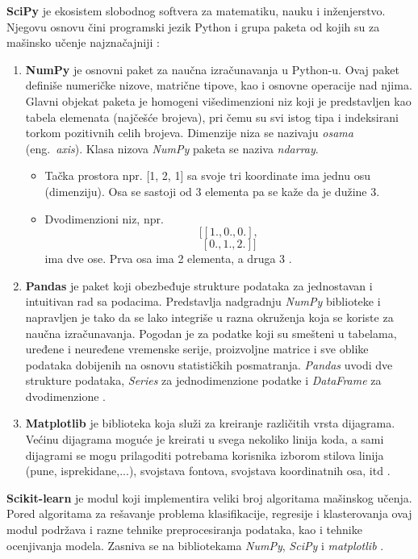 \documentclass[12pt,oneside]{memoir}
\begin{document}
\textbf{SciPy} je ekosistem slobodnog softvera za matematiku, nauku i inženjerstvo. Njegovu osnovu čini programski jezik Python i grupa paketa od kojih su za mašinsko učenje najznačajniji \cite{scipy}:
\begin{enumerate}[1)]
\item \textbf{NumPy} je osnovni paket za naučna izračunavanja u Python-u. Ovaj paket definiše numeričke nizove, matrične tipove, kao i osnovne operacije nad njima.  %
Glavni objekat paketa je homogeni višedimenzioni niz koji je predstavljen kao tabela elemenata (najčešće brojeva), pri čemu su svi istog tipa i indeksirani torkom pozitivnih celih brojeva. Dimenzije niza se nazivaju \textit{osama} (eng.~\textit{axis}). Klasa nizova \textit{NumPy} paketa se naziva \textit{ndarray}.
\begin{itemize}
\item Tačka prostora npr. [1, 2, 1] sa svoje tri koordinate ima jednu osu (dimenziju). Osa se sastoji od 3 elementa pa se kaže da je dužine 3. 
\item Dvodimenzioni niz, npr.
$$[[ 1., 0., 0.],$$ 
$$ [ 0., 1., 2.]] $$
 ima dve ose. Prva osa ima 2 elementa, a druga 3 \cite{scipy, scipy-quickstart}. 
\end{itemize}
\item \textbf{Pandas}  %
je paket koji obezbeđuje strukture podataka za jednostavan i intuitivan rad sa podacima. Predstavlja nadgradnju \textit{NumPy} biblioteke i napravljen je tako da se lako integriše u razna okruženja koja se koriste za naučna izračunavanja. Pogodan je za podatke koji su smešteni u tabelama, uređene i neuređene vremenske serije, proizvoljne matrice i sve oblike podataka dobijenih na osnovu statističkih posmatranja. \textit{Pandas} uvodi dve strukture podataka, \textit{Series} za jednodimenzione podatke i \textit{DataFrame} za dvodimenzione \cite{pandas}. 
\item \textbf{Matplotlib}  %
je biblioteka koja služi za kreiranje različitih vrsta dijagrama. Većinu dijagrama moguće je kreirati u svega nekoliko linija koda, a sami dijagrami se mogu prilagoditi potrebama korisnika izborom stilova linija (pune, isprekidane,...), svojstava fontova, svojstava koordinatnih osa, itd \cite{matplotlib}.
\end{enumerate}

\textbf{Scikit-learn}  %
je modul koji implementira veliki broj algoritama mašinskog učenja. Pored algoritama za rešavanje problema klasifikacije, regresije i klasterovanja ovaj modul podržava i razne tehnike preprocesiranja podataka, kao i tehnike ocenjivanja modela. Zasniva se na bibliotekama \textit{NumPy}, \textit{SciPy} i \textit{matplotlib} \cite{scikit-learn}.
\end{document}
